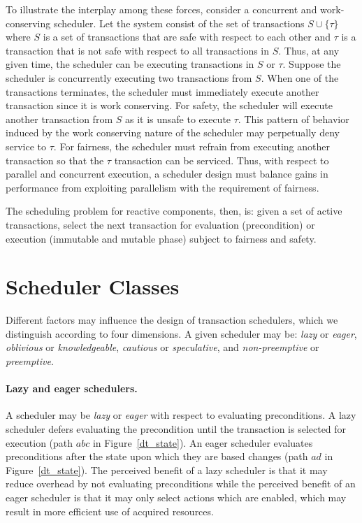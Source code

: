 To illustrate the interplay among these forces, consider a concurrent and work-conserving scheduler.
Let the system consist of the set of transactions $S \cup \{ \tau \}$ where $S$ is a set of transactions that are safe with respect to each other and $\tau$ is a transaction that is not safe with respect to all transactions in $S$.
Thus, at any given time, the scheduler can be executing transactions in $S$ or $\tau$.
Suppose the scheduler is concurrently executing two transactions from $S$.
When one of the transactions terminates, the scheduler must immediately execute another transaction since it is work conserving.
For safety, the scheduler will execute another transaction from $S$ as it is unsafe to execute $\tau$.
This pattern of behavior induced by the work conserving nature of the scheduler may perpetually deny service to $\tau$.
For fairness, the scheduler must refrain from executing another transaction so that the $\tau$ transaction can be serviced.
Thus, with respect to parallel and concurrent execution, a scheduler design must balance gains in performance from exploiting parallelism with the requirement of fairness.

The scheduling problem for reactive components, then, is:  given a set of active transactions, select the next transaction for evaluation (precondition) or execution (immutable and mutable phase) subject to fairness and safety.

\section{Scheduler Classes}

Different factors may influence the design of transaction schedulers, which we distinguish according to four dimensions.
A given scheduler may be:  \emph{lazy} or \emph{eager}, \emph{oblivious} or \emph{knowledgeable}, \emph{cautious} or \emph{speculative}, and \emph{non-preemptive} or \emph{preemptive}.

\paragraph{Lazy and eager schedulers.}
A scheduler may be \emph{lazy} or \emph{eager} with respect to evaluating preconditions.
A lazy scheduler defers evaluating the precondition until the transaction is selected for execution (path $abc$ in Figure~\ref{dt_state}).
An eager scheduler evaluates preconditions after the state upon which they are based changes (path $ad$ in Figure~\ref{dt_state}).
The perceived benefit of a lazy scheduler is that it may reduce overhead by not evaluating preconditions while the perceived benefit of an eager scheduler is that it may only select actions which are enabled, which may result in more efficient use of acquired resources.

